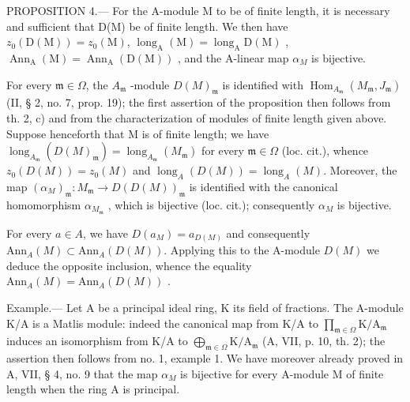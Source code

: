 PROPOSITION 4.--- For the A-module M to be of finite length, it is necessary and sufficient that D(M) be of finite length. We then have \(z_{0}(\mathrm{D}(\mathrm{M})) = z_{0}(\mathrm{M})\), \(\operatorname{long}_{\mathrm{A}}(\mathrm{M}) = \operatorname{long}_{\mathrm{A}}\mathrm{D}(\mathrm{M})\) , \(\operatorname{Ann}_{\mathrm{A}}(\mathrm{M}) = \operatorname{Ann}_{\mathrm{A}}(\mathrm{D}(\mathrm{M}))\) , and the A-linear map \(\alpha_{M}\) is bijective.

For every \(\mathfrak{m} \in \Omega\), the \(A_{\mathfrak{m}}\) -module \(D(M)_{\mathfrak{m}}\) is identified with \(\operatorname{Hom}_{A_{\mathfrak{m}}} (M_{\mathfrak{m}}, J_{\mathfrak{m}})\) (II, § 2, no. 7, prop. 19); the first assertion of the proposition then follows from th. 2, c) and from the characterization of modules of finite length given above. Suppose henceforth that M is of finite length; we have \(\operatorname{long}_{A_{\mathfrak{m}}} (D(M)_{\mathfrak{m}}) = \operatorname{long}_{A_{\mathfrak{m}}} (M_{\mathfrak{m}})\) for every \(\mathfrak{m} \in \Omega\) (loc. cit.), whence \(z_0(D(M)) = z_0(M)\) and \(\operatorname{long}_A(D(M)) = \operatorname{long}_A(M)\). Moreover, the map \((\alpha_{M})_{\mathfrak{m}}: M_{\mathfrak{m}} \to D(D(M))_{\mathfrak{m}}\) is identified with the canonical homomorphism \(\alpha_{M_{\mathfrak{m}}}\) , which is bijective (loc. cit.); consequently \(\alpha_{M}\) is bijective.

For every \(a \in A\), we have \(D(a_{M}) = a_{D(M)}\) and consequently \(\text{Ann}_{A}(M) \subset \text{Ann}_{A}(D(M))\). Applying this to the A-module \(D(M)\) we deduce the opposite inclusion, whence the equality \(\text{Ann}_{A}(M) = \text{Ann}_{A}(D(M))\) .

Example.--- Let A be a principal ideal ring, K its field of fractions. The A-module K/A is a Matlis module: indeed the canonical map from K/A to \(\prod_{\mathfrak{m}\in\Omega}\mathrm{K}/\mathrm{A}_{\mathfrak{m}}\) induces an isomorphism from K/A to \(\bigoplus_{\mathfrak{m}\in\Omega}\mathrm{K}/\mathrm{A}_{\mathfrak{m}}\) (A, VII, p. 10, th. 2); the assertion then follows from no. 1, example 1. We have moreover already proved in A, VII, § 4, no. 9 that the map \(\alpha_{M}\) is bijective for every A-module M of finite length when the ring A is principal.

